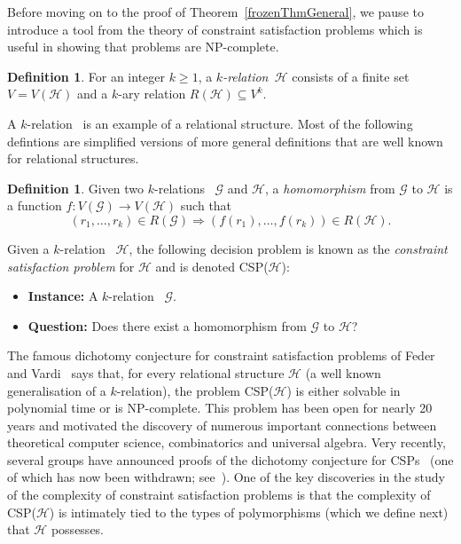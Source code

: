 \documentclass[11 pt]{amsart}
\theoremstyle{definition}
\newtheorem{defn}[equation]{Definition}
\theoremstyle{case}
\numberwithin{equation}{section}
\newcommand\CSP[1]{\textsc{CSP($#1$)}}
\newcommand{\kgraph}{$k$-relation}
\newcommand{\kgraphs}{$k$-relations}
\begin{document}
Before moving on to the proof of Theorem~\ref{frozenThmGeneral}, we 
pause to introduce a tool from the theory of constraint satisfaction
problems which is useful in showing that problems are NP-complete.

\begin{defn}
For an integer $k \geq 1$, a \emph{\kgraph~}$\mathcal{H}$
consists of a finite set $V = V(\mathcal{H})$ and a $k$-ary 
relation $R(\mathcal{H}) \subseteq V^k$. 
\end{defn}

A \kgraph~ is an example of a relational structure.  Most of
the following defintions are simplified versions of more general
definitions that are well known for relational structures.  

\begin{defn}
Given two \kgraphs~ $\mathcal{G}$ and $\mathcal{H}$, 
a \emph{homomorphism} from $\mathcal{G}$ to $\mathcal{H}$ is a function $f:V(\mathcal{G})\to V(\mathcal{H})$ such that 
 \[(r_1,\dots,r_k)\in R(\mathcal{G})\Rightarrow (f(r_1),\dots,f(r_k))\in R({\mathcal{H}}).\] 
\end{defn}

Given a \kgraph~ $\mathcal{H}$, the following decision problem
is known as the \emph{constraint satisfaction problem} for $\mathcal{H}$ and is denoted \CSP{\mathcal{H}}: 
\begin{itemize}
\item[] \textbf{Instance:} A \kgraph~ $\mathcal{G}$. 
\item[] \textbf{Question:} Does there exist a homomorphism from
  $\mathcal{G}$ to $\mathcal{H}$?
\end{itemize}
The famous dichotomy conjecture for constraint satisfaction problems of Feder and Vardi~\cite{CSP} says that, for every relational structure $\mathcal{H}$ (a well known
generalisation of a \kgraph), the problem \CSP{\mathcal{H}} is either solvable in polynomial time or is NP-complete. This problem has been open for nearly 20 years and motivated the discovery of numerous important connections between  theoretical computer science,  combinatorics and universal algebra. Very recently, several groups have announced proofs of the dichotomy conjecture for CSPs~\cite{CSPproof,Bulatov2017,Zhuk2017,Delic2017} (one of which has now been withdrawn; see~\cite{Willard2017}). One of the key discoveries in the study of the complexity of constraint satisfaction problems is that the complexity of \CSP{\mathcal{H}} is intimately tied to the types of polymorphisms (which we define next) that $\mathcal{H}$ possesses. 
\end{document}
